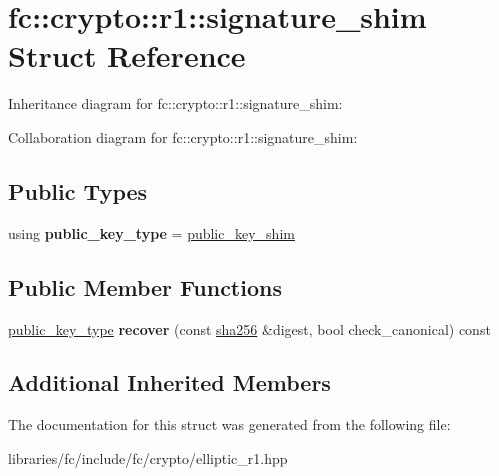 \hypertarget{structfc_1_1crypto_1_1r1_1_1signature__shim}{}\section{fc\+:\+:crypto\+:\+:r1\+:\+:signature\+\_\+shim Struct Reference}
\label{structfc_1_1crypto_1_1r1_1_1signature__shim}


Inheritance diagram for fc\+:\+:crypto\+:\+:r1\+:\+:signature\+\_\+shim\+:


Collaboration diagram for fc\+:\+:crypto\+:\+:r1\+:\+:signature\+\_\+shim\+:
\subsection*{Public Types}
\begin{DoxyCompactItemize}
\item 
\mbox{\label{structfc_1_1crypto_1_1r1_1_1signature__shim_aa7030b00c9fc0499b6a1a3d063bfba58}} 
using {\bfseries public\+\_\+key\+\_\+type} = \mbox{\hyperlink{structfc_1_1crypto_1_1r1_1_1public__key__shim}{public\+\_\+key\+\_\+shim}}
\end{DoxyCompactItemize}
\subsection*{Public Member Functions}
\begin{DoxyCompactItemize}
\item 
\mbox{\label{structfc_1_1crypto_1_1r1_1_1signature__shim_ad9f14d199cecb875b5934163ded58506}} 
\mbox{\hyperlink{structfc_1_1crypto_1_1r1_1_1public__key__shim}{public\+\_\+key\+\_\+type}} {\bfseries recover} (const \mbox{\hyperlink{classfc_1_1sha256}{sha256}} \&digest, bool check\+\_\+canonical) const
\end{DoxyCompactItemize}
\subsection*{Additional Inherited Members}


The documentation for this struct was generated from the following file\+:\begin{DoxyCompactItemize}
\item 
libraries/fc/include/fc/crypto/elliptic\+\_\+r1.\+hpp\end{DoxyCompactItemize}
